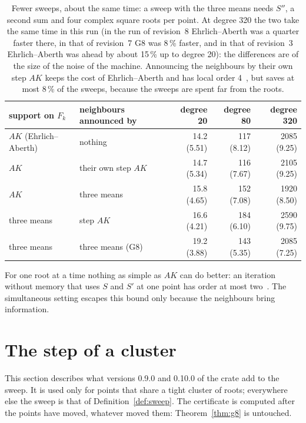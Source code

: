 \documentclass[10pt,a4paper]{article}
\theoremstyle{definition}
\numberwithin{equation}{section}
\begin{document}
\begin{table}[H]\centering\small
\begin{tabular}{llrrr}
\toprule
support on $F_k$ & neighbours announced by & degree 20 & degree 80 & degree 320\\
\midrule
$AK$ (Ehrlich--Aberth) & nothing & 14.2 (5.51) & 117 (8.12) & 2085 (9.25)\\
$AK$ & their own step $AK$ & 14.7 (5.34) & 116 (7.67) & 2105 (9.25)\\
$AK$ & three means & 15.8 (4.65) & 152 (7.08) & 1920 (8.50)\\
three means & step $AK$ & 16.6 (4.21) & 184 (6.10) & 2590 (9.75)\\
three means & three means (G8) & 19.2 (3.88) & 143 (5.35) & 2085 (7.25)\\
\bottomrule
\end{tabular}
\caption{Fewer sweeps, about the same time: a sweep with the three means needs $S''$, a second sum and
four complex square roots per point. At degree 320 the two take the same time in this run (in the run of
revision~8 Ehrlich--Aberth was a quarter faster there, in that of revision~7 G8 was 8\,\% faster, and in
that of revision~3 Ehrlich--Aberth was ahead by about 15\,\% up to degree 20): the differences are of the
size of the noise of the machine. Announcing the neighbours by their own step $AK$ keeps the cost of
Ehrlich--Aberth and has local order 4~\cite{nourein}, but saves at most 8\,\% of the sweeps, because the
sweeps are spent far from the roots.}
\end{table}
For one root at a time nothing as simple as $AK$ can do better: an iteration without memory that
uses $S$ and $S'$ at one point has order at most two~\cite{traub}. The simultaneous setting escapes
this bound only because the neighbours bring information.

\section{The step of a cluster}\label{sec:cluster}
This section describes what versions 0.9.0 and 0.10.0 of the crate add to the sweep. It is used only for
points that share a tight cluster of roots; everywhere else the sweep is that of
Definition~\ref{def:sweep}. The certificate is computed after the points have moved, whatever moved
them: Theorem~\ref{thm:g8} is untouched.
\end{document}
